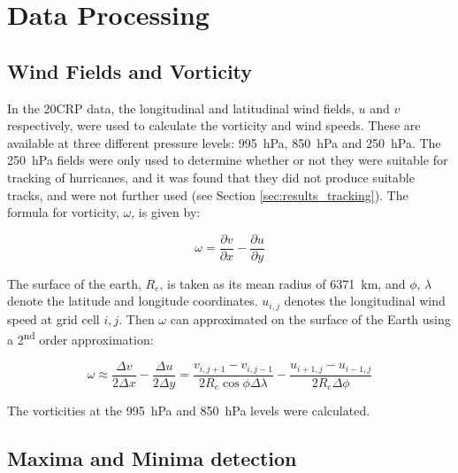 \documentclass[pdftex,12pt,a4paper]{report}
\newcommand{\ts}{\textsuperscript}
\begin{document}
\section{Data Processing}

\subsection{Wind Fields and Vorticity}

In the 20CRP data, the longitudinal and latitudinal wind fields, $u$ and $v$ respectively, were used
to calculate the vorticity and wind speeds. These are available at three different pressure levels:
\SI{995}{hPa}, \SI{850}{hPa} and \SI{250}{hPa}. The \SI{250}{hPa} fields were only used to determine
whether or not they were suitable for tracking of hurricanes, and it was found that they did not
produce suitable tracks, and were not further used (see Section \ref{sec:results_tracking}). The
formula for vorticity, $\omega$, is given by:

\begin{equation}
    \omega = \frac{\partial v}{\partial x} - \frac{\partial u}{\partial y}
    \label{eqn:vorticity}
\end{equation}

The surface of the earth, $R_e$, is taken as its mean radius of \SI{6371}{km}, and $\phi$, $\lambda$
denote the latitude and longitude coordinates. $u_{i, j}$ denotes the longitudinal wind speed at
grid cell $i, j$. Then $\omega$ can approximated on the surface of the Earth using a 2\ts{nd} order
approximation: %


\begin{equation}
    \omega \approx \frac{\Delta v}{2 \Delta x} - \frac{\Delta u}{2 \Delta y} = \frac{v_{i,j+1} - v_{i,j-1}}{2 R_e \cos{\phi} \Delta \lambda} - \frac{u_{i+1,j} - u_{i-1,j}}{2 R_e \Delta \phi }
    \label{eqn:vorticity_2nd_order}
\end{equation}

The vorticities at the \SI{995}{hPa} and \SI{850}{hPa} levels were calculated.

\subsection{Maxima and Minima detection}
\label{sec:methods_maxima_minima}
\end{document}
